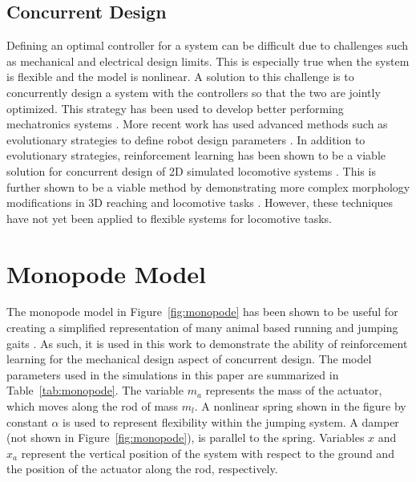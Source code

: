 \documentclass[10pt,twocolumn,letterpaper]{article}
\begin{document}
\subsection{Concurrent Design}

Defining an optimal controller for a system can be difficult due to challenges such as mechanical and electrical design limits. This is especially true when the system is flexible and the model is nonlinear. A solution to this challenge is to concurrently design a system with the controllers so that the two are jointly optimized. This strategy has been used to develop better performing mechatronics systems \cite{Li2001}.  More recent work has used advanced methods such as evolutionary strategies to define robot design parameters \cite{Wang2019}. In addition to evolutionary strategies, reinforcement learning has been shown to be a viable solution for concurrent design of 2D simulated locomotive systems \cite{Ha2019j}. This is further shown to be a viable method by demonstrating more complex morphology modifications in 3D reaching and locomotive tasks \cite{Schaff2019e}. However, these techniques have not yet been applied to flexible systems for locomotive tasks. 

\section{Monopode Model}
\label{sec:monopode_model}

The monopode model in Figure~\ref{fig:monopode} has been shown to be useful for creating a simplified representation of many animal based running and jumping gaits \cite{Blickhan1993a}. As such, it is used in this work to demonstrate the ability of reinforcement learning for the mechanical design aspect of concurrent design. The model parameters used in the simulations in this paper are summarized in Table~\ref{tab:monopode}.
%
The variable $m_a$ represents the mass of the actuator, which moves along the rod of mass $m_l$. A nonlinear spring shown in the figure by constant $\alpha$ is used to represent flexibility within the jumping system. A damper (not shown in Figure~\ref{fig:monopode}), is parallel to the spring. Variables $x$ and $x_a$ represent the vertical position of the system with respect to the ground and the position of the actuator along the rod, respectively.
	
\end{document}
